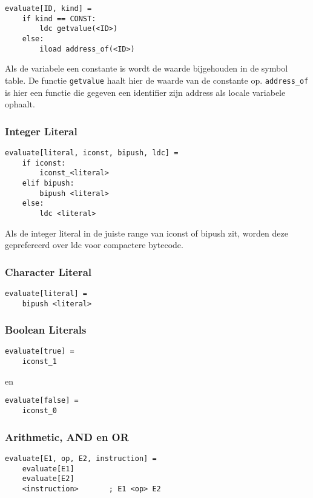 \documentclass[]{article}
\begin{document}
\begin{verbatim}
evaluate[ID, kind] =
    if kind == CONST:
        ldc getvalue(<ID>)
    else:
        iload address_of(<ID>)
\end{verbatim}

Als de variabele een constante is wordt de waarde bijgehouden in de symbol table. De functie \texttt{getvalue} haalt hier de waarde van de constante op.
\texttt{address\_of} is hier een functie die gegeven een identifier zijn address als locale variabele ophaalt.

\subsubsection{Integer Literal}
\begin{verbatim}
evaluate[literal, iconst, bipush, ldc] =
    if iconst:	
        iconst_<literal>
    elif bipush:
        bipush <literal>
    else:	
        ldc <literal>
\end{verbatim}

Als de integer literal in de juiste range van iconst of bipush zit, worden deze geprefereerd over ldc voor compactere bytecode.

\subsubsection{Character Literal}
\begin{verbatim}
evaluate[literal] =
    bipush <literal>
\end{verbatim}

\subsubsection{Boolean Literals}
\begin{verbatim}
evaluate[true] =
    iconst_1
\end{verbatim}

en

\begin{verbatim}
evaluate[false] =
    iconst_0
\end{verbatim}

\subsubsection{Arithmetic, AND en OR}
\begin{verbatim}
evaluate[E1, op, E2, instruction] =
    evaluate[E1]
    evaluate[E2]
    <instruction>		; E1 <op> E2
\end{verbatim}
\end{document}
